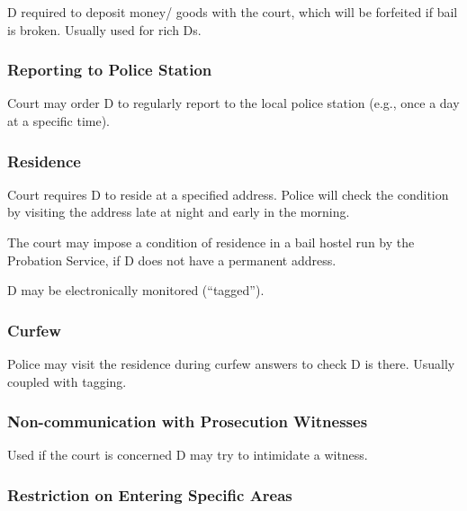 \documentclass[
]{article}
\begin{document}
D required to deposit money/ goods with the court, which will be
forfeited if bail is broken. Usually used for rich Ds.

\hypertarget{reporting-to-police-station}{%
\subsubsection{Reporting to Police
Station}\label{reporting-to-police-station}}

Court may order D to regularly report to the local police station (e.g.,
once a day at a specific time).

\hypertarget{residence}{%
\subsubsection{Residence}\label{residence}}

Court requires D to reside at a specified address. Police will check the
condition by visiting the address late at night and early in the
morning.

The court may impose a condition of residence in a bail hostel run by
the Probation Service, if D does not have a permanent address.

D may be electronically monitored (``tagged'').

\hypertarget{curfew}{%
\subsubsection{Curfew}\label{curfew}}

Police may visit the residence during curfew answers to check D is
there. Usually coupled with tagging.

\hypertarget{non-communication-with-prosecution-witnesses}{%
\subsubsection{Non-communication with Prosecution
Witnesses}\label{non-communication-with-prosecution-witnesses}}

Used if the court is concerned D may try to intimidate a witness.

\hypertarget{restriction-on-entering-specific-areas}{%
\subsubsection{Restriction on Entering Specific
Areas}\label{restriction-on-entering-specific-areas}}
\end{document}
